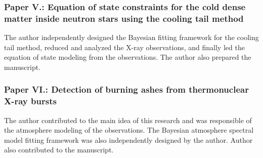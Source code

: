%

\subsubsection*{Paper V.: Equation of state constraints for the cold dense matter inside neutron stars using the cooling tail method}
The author independently designed the Bayesian fitting framework for the cooling tail method, reduced and analyzed the X-ray observations, and finally led the equation of state modeling from the observations. 
The author also prepared the manuscript.

\subsubsection*{Paper VI.: Detection of burning ashes from thermonuclear X-ray bursts}
The author contributed to the main idea of this research and was responsible of the atmosphere modeling of the observations. The Bayesian atmosphere spectral model fitting framework was also independently designed by the author. 
Author also contributed to the manuscript.

%


